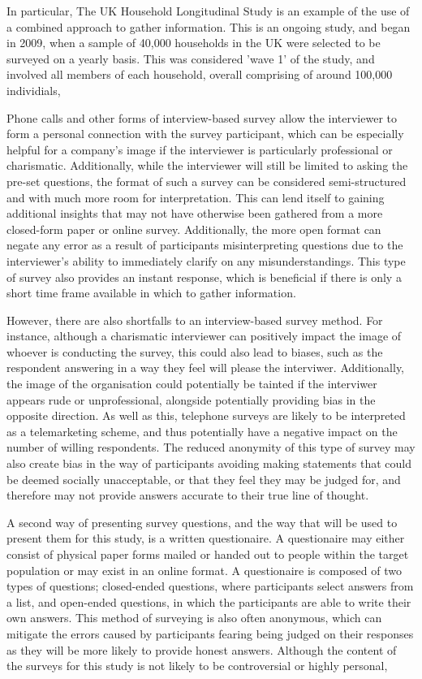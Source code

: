 In particular, The UK Household Longitudinal Study is an example of the use of a combined approach to gather information. 
This is an ongoing study, and began in 2009, when a sample of 40,000 households in the UK were selected to be surveyed on a 
yearly basis. This was considered 'wave 1' of the study, and involved all members of each household, overall comprising of
around 100,000 individials,


Phone calls and other forms of interview-based survey allow the interviewer to form a personal connection with 
the survey participant, which can be especially helpful for a company's image if the interviewer is particularly professional 
or charismatic. Additionally, while the interviewer will still be limited to asking the pre-set questions, the format of such a survey can 
be considered semi-structured and with much more room for interpretation. This can lend itself to gaining additional insights
that may not have otherwise been gathered from a more closed-form paper or online survey. Additionally, the more open format
can negate any error as a result of participants misinterpreting questions due to the interviewer's ability to immediately 
clarify on any misunderstandings. This type of survey also provides an instant response, which is beneficial if there is only 
a short time frame available in which to gather information. 

However, there are also shortfalls to an interview-based survey method. For instance, although a charismatic interviewer can 
positively impact the image of whoever is conducting the survey, this could also lead to biases, such as the respondent 
answering in a way they feel will please the interviwer.
Additionally, the image of the organisation could potentially be tainted if the interviwer appears rude or unprofessional, 
alongside potentially providing bias in the opposite direction. As well as this, telephone surveys are likely to be 
interpreted as a telemarketing scheme, and thus potentially have a negative impact on the number of willing respondents.
The reduced anonymity of this type of survey may also create bias in the way of participants avoiding making statements
that could be deemed socially unacceptable, or that they feel they may be judged for, and therefore may not provide answers
accurate to their true line of thought.

A second way of presenting survey questions, and the way that will be used to present them for this study, is a written questionaire.
A questionaire may either consist of physical paper forms mailed or handed out to people within the target population or may
exist in an online format. A questionaire is composed of two types of questions; closed-ended questions, where participants 
select answers from a list, and open-ended questions, in which the participants are able to write their own answers. This method of surveying
is also often anonymous, which can mitigate the errors caused by participants fearing being judged on their responses as they will be more likely
to provide honest answers. Although the content of the surveys for this study is not likely to be controversial or highly personal, 


